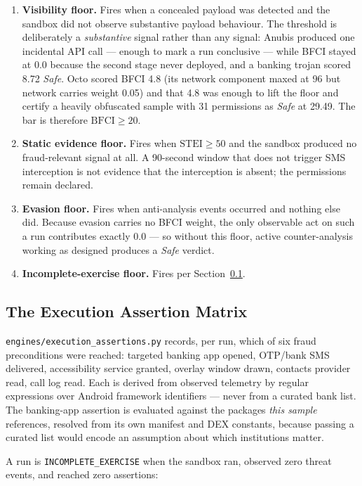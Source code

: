\documentclass{article}
\begin{document}
\begin{enumerate}
\item \textbf{Visibility floor.} Fires when a concealed payload was detected and
the sandbox did not observe substantive payload behaviour. The threshold is
deliberately a \emph{substantive} signal rather than any signal: Anubis produced
one incidental API call --- enough to mark a run conclusive --- while BFCI
stayed at 0.0 because the second stage never deployed, and a banking trojan
scored 8.72 \emph{Safe}. Octo scored BFCI 4.8 (its network component maxed at 96
but network carries weight 0.05) and that 4.8 was enough to lift the floor and
certify a heavily obfuscated sample with 31 permissions as \emph{Safe} at 29.49.
The bar is therefore $\mathrm{BFCI} \ge 20$.
\item \textbf{Static evidence floor.} Fires when $\mathrm{STEI} \ge 50$ and the
sandbox produced no fraud-relevant signal at all. A 90-second window that does
not trigger SMS interception is not evidence that the interception is absent;
the permissions remain declared.
\item \textbf{Evasion floor.} Fires when anti-analysis events occurred and
nothing else did. Because evasion carries no BFCI weight, the only observable
act on such a run contributes exactly 0.0 --- so without this floor, active
counter-analysis working as designed produces a \emph{Safe} verdict.
\item \textbf{Incomplete-exercise floor.} Fires per Section~\ref{ssec:eam}.
\end{enumerate}

\subsection{The Execution Assertion Matrix}
\label{ssec:eam}

\texttt{engines/execution\_assertions.py} records, per run, which of six fraud
preconditions were reached: targeted banking app opened, OTP/bank SMS delivered,
accessibility service granted, overlay window drawn, contacts provider read,
call log read. Each is derived from observed telemetry by regular expressions
over Android framework identifiers --- never from a curated bank list. The
banking-app assertion is evaluated against the packages \emph{this sample}
references, resolved from its own manifest and DEX constants, because passing a
curated list would encode an assumption about which institutions matter.

A run is \texttt{INCOMPLETE\_EXERCISE} when the sandbox ran, observed zero
threat events, and reached zero assertions:
\end{document}
